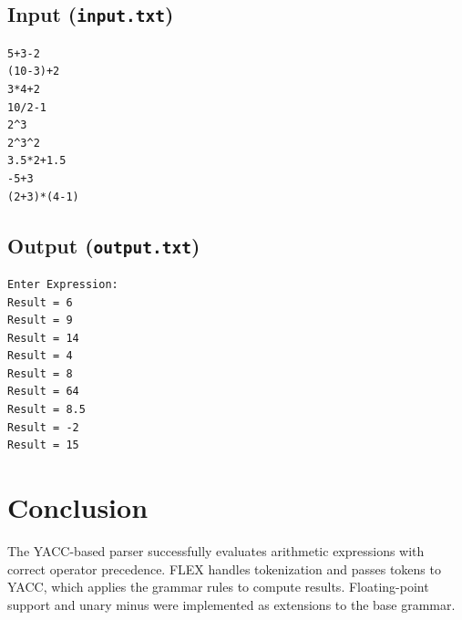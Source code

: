 \documentclass{article}
\begin{document}
\subsection{Input (\texttt{input.txt})}
\begin{lstlisting}
5+3-2
(10-3)+2
3*4+2
10/2-1
2^3
2^3^2
3.5*2+1.5
-5+3
(2+3)*(4-1)
\end{lstlisting}

\subsection{Output (\texttt{output.txt})}
\begin{lstlisting}
Enter Expression:
Result = 6
Result = 9
Result = 14
Result = 4
Result = 8
Result = 64
Result = 8.5
Result = -2
Result = 15
\end{lstlisting}

\section{Conclusion}
The YACC-based parser successfully evaluates arithmetic expressions with correct operator precedence. FLEX handles tokenization and passes tokens to YACC, which applies the grammar rules to compute results. Floating-point support and unary minus were implemented as extensions to the base grammar.
\end{document}
